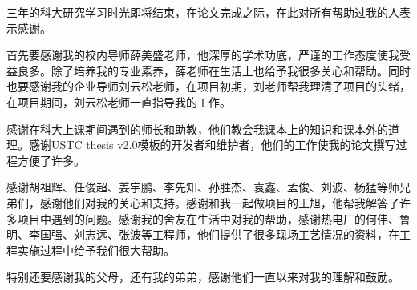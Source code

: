 \begin{acknowledgements}

三年的科大研究学习时光即将结束，在论文完成之际，在此对所有帮助过我的人表示感谢。

首先要感谢我的校内导师薛美盛老师，他深厚的学术功底，严谨的工作态度使我受益良多。除了培养我的专业素养，薛老师在生活上也给予我很多关心和帮助。同时也要感谢我的企业导师刘云松老师，在项目初期，刘老师帮我理清了项目的头绪，在项目期间，刘云松老师一直指导我的工作。

感谢在科大上课期间遇到的师长和助教，他们教会我课本上的知识和课本外的道理。感谢USTC thesis v2.0模板的开发者和维护者，他们的工作使我的论文撰写过程方便了许多。

感谢胡祖辉、任俊超、姜宇鹏、李先知、孙胜杰、袁鑫、孟俊、刘波、杨猛等师兄弟们，感谢他们对我的关心和支持。感谢和我一起做项目的王旭，他帮我解答了许多项目中遇到的问题。感谢我的舍友在生活中对我的帮助，感谢热电厂的何伟、鲁明、李国强、刘志远、张波等工程师，他们提供了很多现场工艺情况的资料，在工程实施过程中给予我们很大帮助。

特别还要感谢我的父母，还有我的弟弟，感谢他们一直以来对我的理解和鼓励。

\end{acknowledgements}
